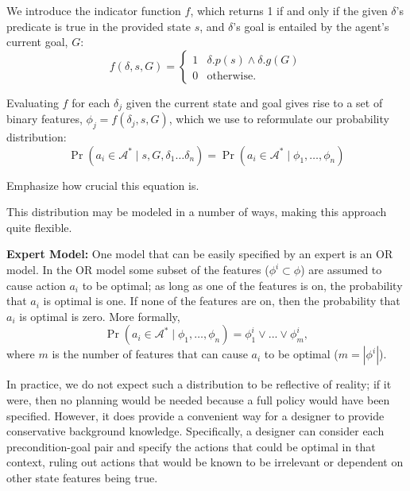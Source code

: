 \documentclass[11pt]{article}
\begin{document}
We introduce the indicator function $f$, which returns 1 if and only if the given $\delta$'s predicate is true in the provided state $s$, and $\delta$'s goal is entailed by the agent's current goal, $G$:
\begin{equation}
f(\delta, s, G) = 
\begin{cases}
1& \delta.p(s) \wedge \delta.g(G) \\
0& \text{otherwise.}
\end{cases}
\label{eq:f_func_def}
\end{equation}

Evaluating $f$ for each $\delta_j$ given the current state and goal gives rise to a set of binary features,
$\phi_j = f(\delta_j, s, G)$, which we use to reformulate our probability distribution:
\begin{equation}
\Pr(a_i \in \mathcal{A}^*  \mid s, G, \delta_1 \ldots \delta_n) = \Pr(a_i \in \mathcal{A}^*  \mid \phi_1, \ldots, \phi_n)
\label{eq:feature_rep}
\end{equation}

Emphasize how crucial this equation is.

This distribution may be modeled in a number of ways, making this
approach quite flexible. 

{\bf Expert Model:} One model that can be easily specified by
an expert is an OR model.
In the OR model some subset of the features 
($\phi^i \subset \phi$) are
assumed to cause action $a_i$ to be optimal; as long as one of
the features is on, the probability that $a_i$ is optimal is one.
If none of the features are on, then the probability that $a_i$ is 
optimal is zero. More formally,
\begin{equation}
\Pr(a_i \in \mathcal{A}^*  \mid \phi_1, \ldots, \phi_n) = \phi_1^i \lor ... \lor \phi_m^i,
\end{equation}
where $m$ is the number of features that can cause $a_i$ to be optimal ($m = |\phi^i|$).

In practice, we do not expect such a distribution to be reflective of
reality; if it were, then no planning would be needed because a full
policy would have been specified. However, it does provide a
convenient way for a designer to provide conservative background
knowledge. Specifically, a designer can consider each precondition-goal
pair and specify the actions that could be optimal in that context, ruling
out actions that would be known to be irrelevant or dependent on other
state features being true.
\end{document}
